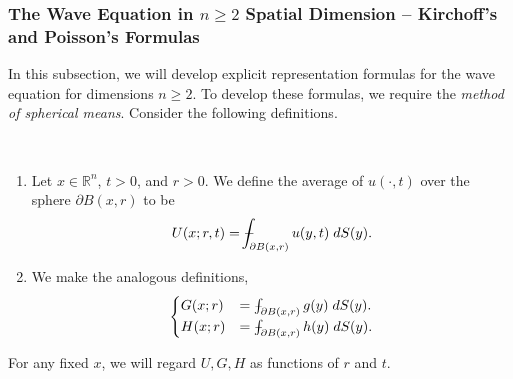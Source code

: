 \documentclass{article}
\def\Xint#1{\mathchoice
	{\XXint\displaystyle\textstyle{#1}}%
	{\XXint\textstyle\scriptstyle{#1}}%
	{\XXint\scriptstyle\scriptscriptstyle{#1}}%
	{\XXint\scriptscriptstyle\scriptscriptstyle{#1}}%
	\!\int}
\def\XXint#1#2#3{{\setbox0=\hbox{$#1{#2#3}{\int}$ }
		\vcenter{\hbox{$#2#3$ }}\kern-0.6\wd0}}
\def\dashint{\Xint-}
\numberwithin{equation}{section}
\begin{document}
	\subsubsection{The Wave Equation in \texorpdfstring{$n\geq 2$}{>2} Spatial Dimension -- Kirchoff's and Poisson's Formulas}
	In this subsection, we will develop explicit representation formulas for the wave equation for dimensions $n \geq 2$. To develop these formulas, we require the \textit{method of spherical means}. Consider the following definitions. 
	
	\begin{definition}
		$ $\newline \vspace{-0.25cm}
		\begin{enumerate}[itemsep =-2pt,label = (\roman{*})]
			\item Let $x \in \mathbb{R}^{n}$, $t > 0$, and $r > 0$. We define the average of $u(\cdot, t)$ over the sphere $\partial B(x, r)$ to be 
			\begin{equation}
				U(x;r, t) = \dashint_{\partial B(x, r)} u(y,t)\;dS(y).
			\end{equation}
			\item We make the analogous definitions, 
			\begin{equation}
				\begin{cases}
					G(x; r) &= \dashint_{\partial B(x,r)}g(y)\;dS(y). \\
					H(x; r) &= \dashint_{\partial B(x,r)}h(y)\;dS(y). 
				\end{cases}
			\end{equation}
		\end{enumerate}
		For any fixed $x$, we will regard $U, G, H$ as functions of $r$ and $t$. 
	\end{definition}
	
\end{document}

